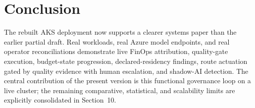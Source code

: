 \section{Conclusion}
The rebuilt AKS deployment now supports a clearer systems paper than the earlier partial draft. Real workloads, real Azure model endpoints, and real operator reconciliations demonstrate live FinOps attribution, quality-gate execution, budget-state progression, declared-residency findings, route actuation gated by quality evidence with human escalation, and shadow-AI detection. The central contribution of the present version is this functional governance loop on a live cluster; the remaining comparative, statistical, and scalability limits are explicitly consolidated in Section~10.
